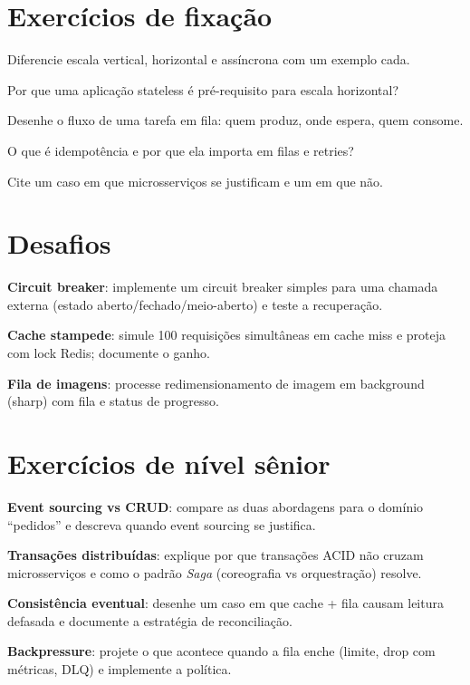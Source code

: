 \section{Exercícios de fixação}

\begin{exercicios}
  \item Diferencie escala vertical, horizontal e assíncrona com um exemplo cada.
  \item Por que uma aplicação stateless é pré-requisito para escala horizontal?
  \item Desenhe o fluxo de uma tarefa em fila: quem produz, onde espera, quem consome.
  \item O que é idempotência e por que ela importa em filas e retries?
  \item Cite um caso em que microsserviços se justificam e um em que não.
\end{exercicios}

\section{Desafios}

\begin{desafios}
  \item \textbf{Circuit breaker}: implemente um circuit breaker simples para uma chamada externa (estado aberto/fechado/meio-aberto) e teste a recuperação.
  \item \textbf{Cache stampede}: simule 100 requisições simultâneas em cache miss e proteja com lock Redis; documente o ganho.
  \item \textbf{Fila de imagens}: processe redimensionamento de imagem em background (sharp) com fila e status de progresso.
\end{desafios}

\section{Exercícios de nível sênior}

\begin{seniores}
  \item \textbf{Event sourcing vs CRUD}: compare as duas abordagens para o domínio ``pedidos'' e descreva quando event sourcing se justifica.
  \item \textbf{Transações distribuídas}: explique por que transações ACID não cruzam microsserviços e como o padrão \emph{Saga} (coreografia vs orquestração) resolve.
  \item \textbf{Consistência eventual}: desenhe um caso em que cache + fila causam leitura defasada e documente a estratégia de reconciliação.
  \item \textbf{Backpressure}: projete o que acontece quando a fila enche (limite, drop com métricas, DLQ) e implemente a política.
\end{seniores}

